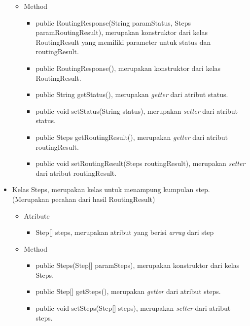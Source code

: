 \begin{itemize}
\begin{itemize}
							\item Method
					
					
									\begin{itemize}
												\item public RoutingResponse(String paramStatus, Steps paramRoutingResult), merupakan konstruktor dari kelas RoutingResult yang memiliki parameter untuk status dan routingResult.
												\item public RoutingResponse(), merupakan konstruktor dari kelas RoutingResult.
												\item public String getStatus(), merupakan \textit{getter} dari atribut status.
												\item public void setStatus(String status), merupakan \textit{setter} dari atribut status.
												\item public Steps getRoutingResult(), merupakan \textit{getter} dari atribut routingResult.
												\item public void setRoutingResult(Steps routingResult), merupakan \textit{setter} dari atribut routingResult.
									\end{itemize}
				\end{itemize}
		
		\item Kelas Steps, merupakan kelas untuk menampung kumpulan step. (Merupakan pecahan dari hasil RoutingResult)
		
		
				\begin{itemize}
							\item Atribute
					
					
									\begin{itemize}
												\item Step[] steps, merupakan atribut yang berisi \textit{array} dari step
									\end{itemize}
					
							\item Method
					
					
									\begin{itemize}
												\item public Steps(Step[] paramSteps), merupakan konstruktor dari kelas Steps.
												\item public Step[] getSteps(), merupakan \textit{getter} dari atribut steps.
												\item public void setSteps(Step[] steps), merupakan \textit{setter} dari atribut steps.
									\end{itemize}
				\end{itemize}
		

\end{itemize}
